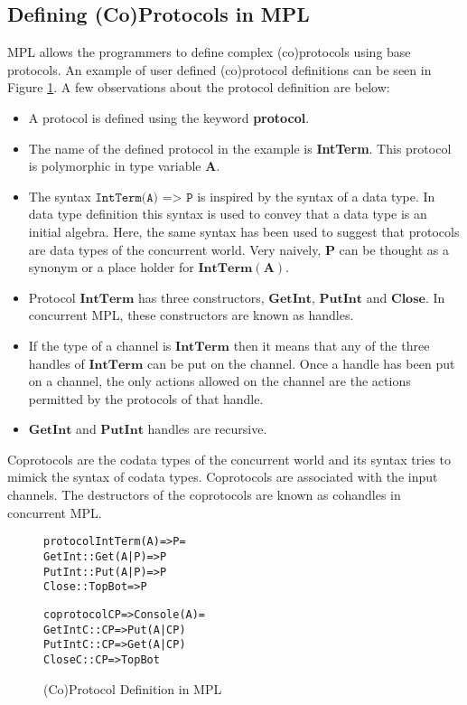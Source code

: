 \documentclass[11pt]{article}
\newcommand{\<}{\langle}
\renewcommand{\>}{\rangle}
\begin{document}
\subsection {Defining (Co)Protocols in MPL}
MPL allows the programmers to define complex (co)protocols using base protocols. An example of user defined (co)protocol definitions can be seen in Figure \ref {fig:Conc_ProtDefn}. A few observations about the protocol definition are below:
\begin{itemize}
  \item A protocol is defined using the keyword {\bf protocol}.
  \item The name of the defined protocol in the example is {\bf IntTerm}. This protocol is polymorphic in type variable $\mathbf{A}$.
  \item The syntax $\texttt{IntTerm(A) => P}$ is inspired by the syntax of a data type. In data type definition this syntax is used to convey that a data type is an initial algebra. Here, the same syntax has been used to suggest that protocols are data types of the concurrent world. Very naively, $\mathbf{P}$ can be thought as a synonym or a place holder for $\mathbf{IntTerm(A)}$.
  \item Protocol $\mathbf {IntTerm}$ has three constructors, $\mathbf {GetInt}$, $\mathbf {PutInt}$ and $\mathbf {Close}$. In concurrent MPL, these constructors are known as handles.
  \item If the type of a channel is $\mathbf {IntTerm}$ then it means that any of the three handles of $\mathbf {IntTerm}$ can be put on the channel. Once a handle has been put on a channel, the only actions allowed on the channel are the actions permitted by the protocols of that handle.
  \item $\mathbf{GetInt}$ and $\mathbf{PutInt}$ handles are recursive.
\end{itemize}
Coprotocols are the codata types of the concurrent world and its syntax tries to mimick the syntax of codata types. Coprotocols are associated with the input channels. The destructors of the coprotocols are known as cohandles in concurrent MPL.

\begin{figure}
\begin{alltt}
                protocol IntTerm (A) => P = 
                      GetInt :: Get (A|P) => P
                      PutInt :: Put (A|P) => P
                      Close  :: TopBot    => P

                coprotocol CP => Console (A) =
                    GetIntC   :: CP => Put (A|CP)  
                    PutIntC   :: CP => Get (A|CP) 
                    CloseC    :: CP => TopBot  
\end{alltt}
\caption{(Co)Protocol Definition in MPL} 
\label{fig:Conc_ProtDefn}
\end{figure}
\end{document}

